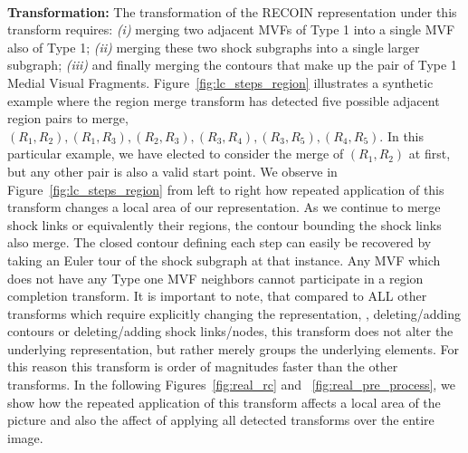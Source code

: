 

\noindent\\
{\bf Transformation:} The transformation of the RECOIN representation under this transform requires: \emph{(i)} merging two adjacent MVFs of Type 1 into a single MVF also of Type 1; \emph{(ii)} merging these two shock subgraphs into a single larger subgraph; \emph{(iii)} and finally merging the contours that make up the pair of Type 1 Medial Visual Fragments. Figure~\ref{fig:lc_steps_region} illustrates a synthetic example where the region merge transform has detected five possible adjacent region pairs to merge,  $(R_1,R_2),(R_1,R_3), (R_2,R_3), (R_3,R_4),(R_3,R_5), (R_4,R_5)$. In this particular example, we have elected to consider the merge of $(R_1,R_2)$ at first, but any other pair is also a valid start point. We observe in Figure~\ref{fig:lc_steps_region} from left to right how repeated application of this transform changes a local area of our representation. As we continue to merge shock links or equivalently their regions, the contour bounding the shock links also merge. The closed contour defining each step can easily be recovered by taking an Euler tour of the shock subgraph at that instance. Any MVF which does not have any Type one MVF neighbors cannot participate in a region completion transform. It is important to note, that compared to ALL other transforms which require explicitly changing the representation, \ie, deleting/adding contours or deleting/adding shock links/nodes, this transform does not alter the underlying representation, but rather merely groups the underlying elements. For this reason this transform is order of magnitudes faster than the other transforms. In the following Figures~\ref{fig:real_rc} and ~\ref{fig:real_pre_process}, we show how the repeated application of this transform affects a local area of the picture and also the affect of applying all detected transforms over the entire image. 


